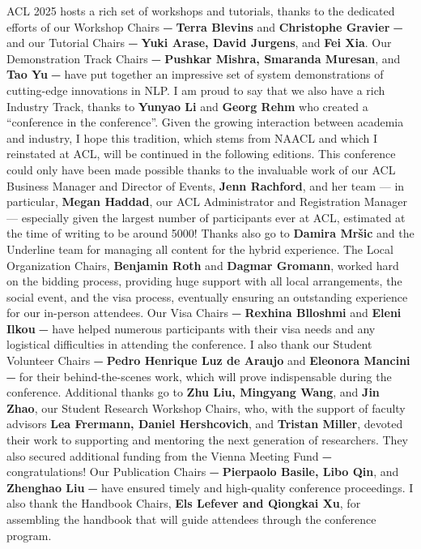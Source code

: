 ACL 2025 hosts a rich set of workshops and tutorials, thanks to the dedicated efforts of our Workshop Chairs ⏤ \textbf{Terra Blevins} and \textbf{Christophe Gravier} ⏤ and our Tutorial Chairs ⏤ \textbf{Yuki Arase, David Jurgens}, and \textbf{Fei Xia}. Our Demonstration Track Chairs ⏤ \textbf{Pushkar Mishra, Smaranda Muresan}, and \textbf{Tao Yu} ⏤ have put together an impressive set of system demonstrations of cutting-edge innovations in NLP. I am proud to say that we also have a rich Industry Track, thanks to \textbf{Yunyao Li} and \textbf{Georg Rehm} who created a “conference in the conference”. Given the growing interaction between academia and industry, I hope this tradition, which stems from NAACL and which I reinstated at ACL, will be continued in the following editions.
This conference could only have been made possible thanks to the invaluable work of our ACL Business Manager and Director of Events, \textbf{Jenn Rachford}, and her team — in particular, \textbf{Megan Haddad}, our ACL Administrator and Registration Manager — especially given the largest number of participants ever at ACL, estimated at the time of writing to be around 5000! Thanks also go to \textbf{Damira Mršic} and the Underline team for managing all content for the hybrid experience. The Local Organization Chairs, \textbf{Benjamin Roth} and \textbf{Dagmar Gromann}, worked hard on the bidding process, providing huge support with all local arrangements, the social event, and the visa process, eventually ensuring an outstanding experience for our in-person attendees. Our Visa Chairs ⏤ \textbf{Rexhina Blloshmi} and \textbf{Eleni Ilkou} ⏤ have helped numerous participants with their visa needs and any logistical difficulties in attending the conference. I also thank our Student Volunteer Chairs ⏤ \textbf{Pedro Henrique Luz de Araujo} and \textbf{Eleonora Mancini} ⏤ for their behind-the-scenes work, which will prove indispensable during the conference. 
Additional thanks go to \textbf{Zhu Liu, Mingyang Wang}, and \textbf{Jin Zhao}, our Student Research Workshop Chairs, who, with the support of faculty advisors \textbf{Lea Frermann, Daniel Hershcovich}, and \textbf{Tristan Miller}, devoted their work to supporting and mentoring the next generation of researchers. They also secured additional funding from the Vienna Meeting Fund ⏤ congratulations!
Our Publication Chairs ⏤ \textbf{Pierpaolo Basile, Libo Qin}, and \textbf{Zhenghao Liu} ⏤ have ensured timely and high-quality conference proceedings. I also thank the Handbook Chairs, \textbf{Els Lefever and Qiongkai Xu}, for assembling the handbook that will guide attendees through the conference program.
